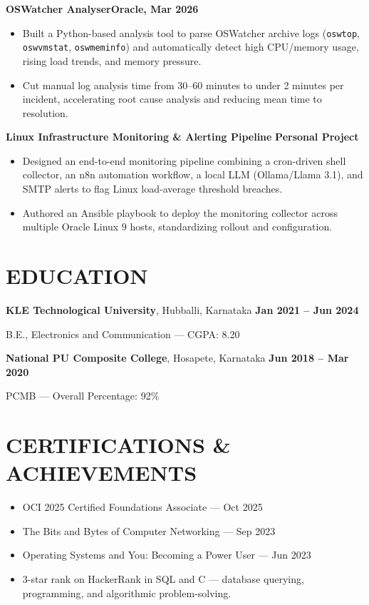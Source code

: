 \documentclass[a4paper,10pt]{extarticle}
\begin{document}
\textbf{OSWatcher Analyser}\hfill\textbf{Oracle, Mar 2026}\par
\begin{itemize}
  \item Built a Python-based analysis tool to parse OSWatcher archive logs
  (\texttt{oswtop}, \texttt{oswvmstat}, \texttt{oswmeminfo}) and automatically detect
  high CPU/memory usage, rising load trends, and memory pressure.
  \item Cut manual log analysis time from 30--60 minutes to under 2 minutes per
  incident, accelerating root cause analysis and reducing mean time to resolution.
\end{itemize}

\textbf{Linux Infrastructure Monitoring \& Alerting Pipeline}
\hfill\textbf{Personal Project}\par
\begin{itemize}
  \item Designed an end-to-end monitoring pipeline combining a cron-driven shell
  collector, an n8n automation workflow, a local LLM (Ollama/Llama 3.1), and
  SMTP alerts to flag Linux load-average threshold breaches.
  \item Authored an Ansible playbook to deploy the monitoring collector across
  multiple Oracle Linux 9 hosts, standardizing rollout and configuration.
\end{itemize}

\section*{EDUCATION}
\textbf{KLE Technological University}, Hubballi, Karnataka
\hfill\textbf{Jan 2021 -- Jun 2024}\par
B.E., Electronics and Communication --- CGPA: 8.20\par
\vspace{2pt}
\textbf{National PU Composite College}, Hosapete, Karnataka
\hfill\textbf{Jun 2018 -- Mar 2020}\par
PCMB --- Overall Percentage: 92\%\par

\section*{CERTIFICATIONS \& ACHIEVEMENTS}
\begin{itemize}
  \item OCI 2025 Certified Foundations Associate --- Oct 2025
  \item The Bits and Bytes of Computer Networking --- Sep 2023
  \item Operating Systems and You: Becoming a Power User --- Jun 2023
  \item 3-star rank on HackerRank in SQL and C --- database querying,
  programming, and algorithmic problem-solving.
\end{itemize}
\end{document}
